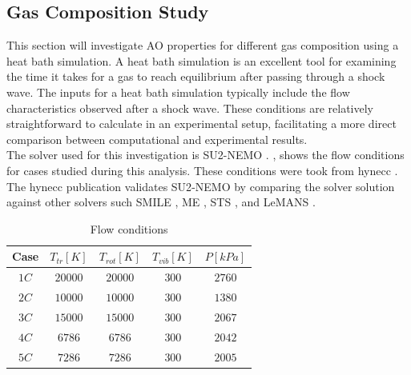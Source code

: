 \subsection{Gas Composition Study\label{sec:gasComposition}}
This section will investigate \gls{AO} properties for different gas composition
using a heat bath simulation. A heat bath simulation is an
excellent tool for examining the time it takes for a gas to reach equilibrium
after passing through a shock wave. The inputs for a heat bath simulation
typically include the flow characteristics observed after a shock wave. These
conditions are relatively straightforward to calculate in an experimental
setup, facilitating a more direct comparison between computational and
experimental results. \\

The solver used for this investigation is \gls{SU2}-\gls{NEMO} \cite{Palacios2013a}. , shows the flow conditions for
cases studied during this analysis. These conditions were took from
\gls{hynecc} \cite{Gimelshein2022}. The \gls{hynecc} publication validates
\gls{SU2}-\gls{NEMO} by comparing the solver solution against other solvers
such SMILE \cite{Ivanov1998}, ME \cite{Andrienko2016}, STS \cite{Campoli2020},
and LeMANS \cite{Scalabrin2007}.
\begin{table}[H]
    \begin{center}
        \begin{tabular}{|c|c|c|c|c|}
        \hline
         Case & $T_{tr}\left[K\right]$ & $T_{rot}\left[K\right]$ &
            $T_{vib}\left[K\right]$ &  $P\left[kPa\right]$ \\ \hline\hline
            $1C$\cite{Gimelshein2022} & $20000$ & $20000$ & $300$ & $2760$ \\ \hline 
            $2C$\cite{Gimelshein2022} & $10000$ & $10000$ & $300$ & $1380$ \\ \hline 
            $3C$\cite{Gimelshein2022} & $15000$ & $15000$ & $300$ & $2067$ \\ \hline
            $4C$\cite{Wang2023} &       $6786$ & $6786$ & $300$ & $2042$ \\ \hline
            $5C$\cite{Wang2023} &       $7286$ & $7286$ & $300$ & $2005$ \\ \hline
        \end{tabular}
        \caption{Flow conditions}\label{tab:gasCompositionStudyMassFraction}
    \end{center}
\end{table}

